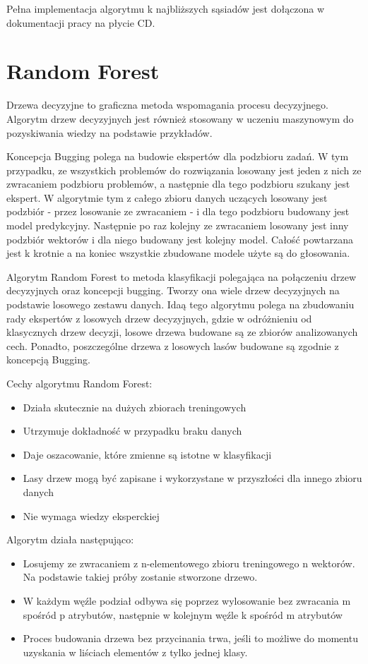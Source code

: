 \documentclass[brudnopis]{xmgr}
\begin{document}
Pełna implementacja algorytmu k najbliższych sąsiadów jest dołączona w dokumentacji pracy na płycie CD.

\section{Random Forest}
Drzewa decyzyjne to graficzna metoda wspomagania procesu decyzyjnego. Algorytm drzew decyzyjnych jest również stosowany w uczeniu maszynowym do pozyskiwania wiedzy na podstawie przykładów.
\newpage

Koncepcja Bugging polega na budowie ekspertów dla podzbioru zadań. W tym przypadku, ze wszystkich problemów do rozwiązania losowany jest jeden z nich ze zwracaniem podzbioru problemów, a następnie dla tego podzbioru szukany jest ekspert. W algorytmie tym z całego zbioru danych uczących losowany jest podzbiór - przez losowanie ze zwracaniem - i dla tego podzbioru budowany jest model predykcyjny. Następnie po raz kolejny ze zwracaniem losowany jest inny podzbiór wektorów i dla niego budowany jest kolejny model. Całość powtarzana jest k krotnie a na koniec wszystkie zbudowane modele użyte są do głosowania.

Algorytm Random Forest\cite{3}\cite{13} to metoda klasyfikacji polegająca na połączeniu drzew decyzyjnych oraz koncepcji bugging. Tworzy ona wiele drzew decyzyjnych na podstawie losowego zestawu danych. Idaą tego algorytmu polega na zbudowaniu rady ekspertów z losowych drzew decyzyjnych, gdzie w odróżnieniu od klasycznych drzew decyzji, losowe drzewa budowane są ze zbiorów analizowanych cech. Ponadto, poszczególne drzewa z losowych lasów budowane są zgodnie z koncepcją Bugging.

Cechy algorytmu Random Forest:
\begin{itemize}
\item
Działa skutecznie na dużych zbiorach treningowych
\item
Utrzymuje dokładność w przypadku braku danych
\item
Daje oszacowanie, które zmienne są istotne w klasyfikacji
\item
Lasy drzew mogą być zapisane i wykorzystane w przyszłości dla innego zbioru danych
\item
Nie wymaga wiedzy eksperckiej
\end{itemize}

Algorytm działa następująco:
\begin{itemize}
\item
Losujemy ze zwracaniem z n-elementowego zbioru treningowego n wektorów. Na podstawie takiej próby zostanie stworzone drzewo.
\item
W każdym węźle podział odbywa się poprzez wylosowanie bez zwracania m spośród p atrybutów, następnie w kolejnym węźle k spośród m atrybutów
\item
Proces budowania drzewa bez przycinania trwa, jeśli to możliwe do momentu uzyskania w liściach elementów z tylko jednej klasy.
\end{itemize}
\newpage
\end{document}
